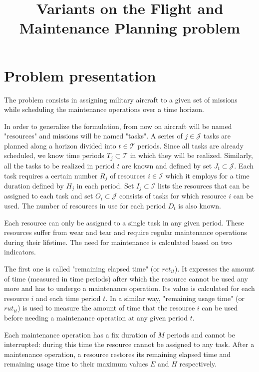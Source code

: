 \documentclass[a4paper,11pt]{article}
\title{Variants on the Flight and Maintenance Planning problem}
\author{}
\begin{document}
\maketitle


\section{Problem presentation}

    The problem consists in assigning military aircraft to a given set of missions while scheduling the maintenance operations over a time horizon.

    In order to generalize the formulation, from now on aircraft will be named "resources" and missions will be named "tasks". A series of $j \in \mathcal{J}$ tasks are planned along a horizon divided into $t \in \mathcal{T}$ periods. Since all tasks are already scheduled, we know time periods $T_j \subset \mathcal{T}$ in which they will be realized. Similarly, all the tasks to be realized in period $t$ are known and defined by set $J_t \subset \mathcal{J}$. Each task requires a certain number $R_{j}$ of resources $i \in \mathcal{I}$ which it employs for a time duration defined by $H_j$ in each period. Set $I_{j} \subset \mathcal{I}$ lists the resources that can be assigned to each task and set $O_i \subset \mathcal{J}$ consists of tasks for which resource $i$ can be used. The number of resources in use for each period $D_t$ is also known.

    Each resource can only be assigned to a single task in any given period. These resources suffer from wear and tear and require regular maintenance operations during their lifetime. The need for maintenance is calculated based on two indicators.

    The first one is called "remaining elapsed time" (or $ret_{it}$). It expresses the amount of time (measured in time periods) after which the resource cannot be used any more and has to undergo a maintenance operation. Its value is calculated for each resource $i$ and each time period $t$. In a similar way, "remaining usage time" (or $rut_{it}$) is used to measure the amount of time that the resource $i$ can be used before needing a maintenance operation at any given period $t$.

    Each maintenance operation has a fix duration of $M$ periods and cannot be interrupted: during this time the resource cannot be assigned to any task. After a maintenance operation, a resource restores its remaining elapsed time and remaining usage time to their maximum values $E$ and $H$ respectively.
\end{document}
